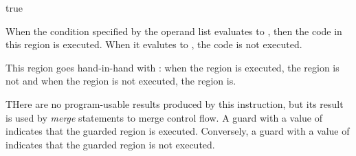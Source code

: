 \begin{instruction}{true}

  \begin{notes}
    When the condition specified by the operand list evaluates to
    , then the code in this region is executed.  When it
    evalutes to , the code is not executed.

    This region goes hand-in-hand with : when
    the  region is executed, the  region
    is not and when the  region is not executed, the
     region is.
  \end{notes}

  \begin{results}
  \item THere are no program-usable results produced by this
    instruction, but its result is used by \emph{merge} statements to
    merge control flow.  A guard with a value of  indicates
    that the guarded region is executed.  Conversely, a guard with a
    value of  indicates that the guarded region is not
    executed.
  \end{results}

  \begin{operands}
  \item {}
  \end{operands}

  \begin{seealso}
  \end{seealso}
\end{instruction}


